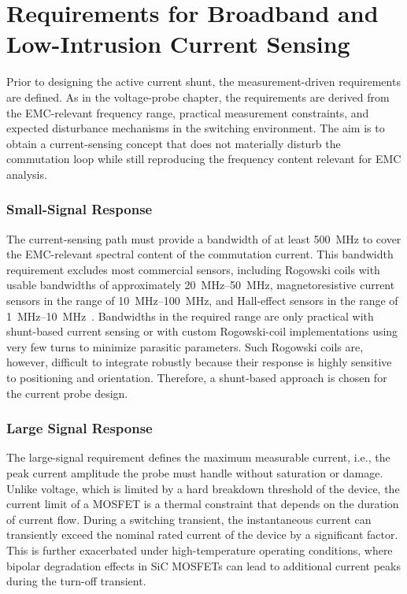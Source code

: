 
\section{Requirements for Broadband and Low-Intrusion Current Sensing}

Prior to designing the active current shunt, the measurement-driven requirements are defined.
As in the voltage-probe chapter, the requirements are derived from the EMC-relevant frequency range, practical measurement constraints, and expected disturbance mechanisms in the switching environment.
The aim is to obtain a current-sensing concept that does not materially disturb the commutation loop while still reproducing the frequency content relevant for EMC analysis.

\subsubsection*{Small-Signal Response}
The current-sensing path must provide a bandwidth of at least \SI{500}{MHz} to cover the EMC-relevant spectral content of the commutation current.
This bandwidth requirement excludes most commercial sensors, including Rogowski coils with usable bandwidths of approximately \SIrange{20}{50}{MHz}, magnetoresistive current sensors in the range of \SIrange{10}{100}{MHz}, and Hall-effect sensors in the range of \SIrange{1}{10}{MHz}~\cite{xin_review_2022}.
Bandwidths in the required range are only practical with shunt-based current sensing or with custom Rogowski-coil implementations using very few turns to minimize parasitic parameters.
Such Rogowski coils are, however, difficult to integrate robustly because their response is highly sensitive to positioning and orientation.
Therefore, a shunt-based approach is chosen for the current probe design.

\subsubsection*{Large Signal Response}
The large-signal requirement defines the maximum measurable current, i.e., the peak current amplitude the probe must handle without saturation or damage.
Unlike voltage, which is limited by a hard breakdown threshold of the device, the current limit of a MOSFET is a thermal constraint that depends on the duration of current flow.
During a switching transient, the instantaneous current can transiently exceed the nominal rated current of the device by a significant factor.
This is further exacerbated under high-temperature operating conditions, where bipolar degradation effects in SiC MOSFETs can lead to additional current peaks during the turn-off transient.

